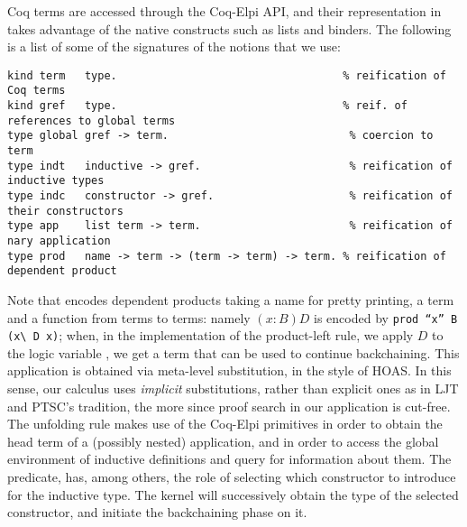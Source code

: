 Coq terms are accessed through the Coq-Elpi API, and their representation
in \lP takes advantage of the native \lP constructs such as lists and binders.
The following is a list of some of the signatures of the notions that we use:
\begin{lstlisting}[language=lprolog]
kind term   type.                                   % reification of Coq terms
kind gref   type.                                   % reif. of references to global terms
type global gref -> term.                            % coercion to term
type indt   inductive -> gref.                       % reification of inductive types
type indc   constructor -> gref.                     % reification of their constructors 
type app    list term -> term.                       % reification of nary application
type prod   name -> term -> (term -> term) -> term. % reification of dependent product
\end{lstlisting}

Note that  encodes dependent products taking a name for pretty
printing, a term and a \lP function from terms to terms: namely $(x :
B) D$ is encoded by \texttt{prod ``x'' B (x\textbackslash{} D x)}; when, in the
implementation of the product-left rule, we apply $D$ to the logic variable
, we get a term that can be used to continue backchaining. This
application is obtained via meta-level substitution, in the style of HOAS. In
this sense, our calculus uses \emph{implicit} substitutions, rather than
explicit ones as in LJT and PTSC's tradition, the more since proof search in
our application is cut-free.
The unfolding rule makes use of the Coq-Elpi primitives
 in order to obtain the head term of a (possibly
nested) application, and  in order to access the global
environment of inductive definitions and query for information about them.
The  predicate,  has, among others, the role of selecting which
constructor to introduce for the inductive type. The kernel will successively
obtain the type of the selected constructor, and initiate the backchaining
phase on it.

